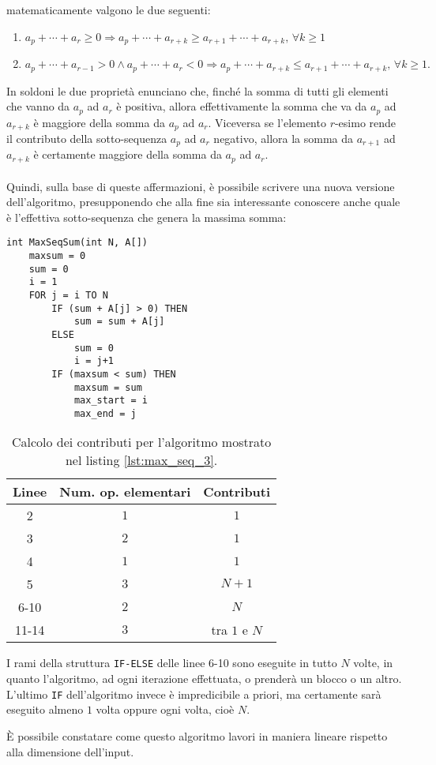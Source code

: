 \documentclass[11pt,a4paper,oneside]{article}
\begin{document}
matematicamente valgono le due seguenti:
\begin{enumerate}
	\item $a_p + \cdots + a_r \geq 0 \Rightarrow a_p + \cdots + a_{r+k} \geq a_{r+1} + \cdots + a_{r+k},\,\forall k \geq 1$ 
	\item $a_p + \cdots + a_{r-1} > 0 \wedge a_p + \cdots + a_r < 0 \Rightarrow a_p + \cdots + a_{r+k} \leq a_{r+1} + \cdots + a_{r+k},\, \forall k \geq 1\text{.}$
\end{enumerate}
In soldoni le due proprietà enunciano che, finché la somma di tutti gli elementi che vanno da $a_p$ ad $a_r$ è positiva, allora effettivamente la somma che va da $a_p$ ad $a_{r+k}$ è maggiore della somma da $a_p$ ad $a_r$. Viceversa se l'elemento $r$-esimo rende il contributo della sotto-sequenza $a_p$ ad $a_r$ negativo, allora la somma da $a_{r+1}$ ad $a_{r+k}$ è certamente maggiore della somma da $a_p$ ad $a_r$.\\\\Quindi, sulla base di queste affermazioni, è possibile scrivere una nuova versione dell'algoritmo, presupponendo che alla fine sia interessante conoscere anche quale è l'effettiva sotto-sequenza che genera la massima somma:

\begin{lstlisting}[caption={Calcolo della massima somma di una sotto-sequenza, versione 3.},label={lst:max_seq_3}]
int MaxSeqSum(int N, A[])
	maxsum = 0
	sum = 0
	i = 1
	FOR j = i TO N
		IF (sum + A[j] > 0) THEN
			sum = sum + A[j]
		ELSE
			sum = 0
			i = j+1
		IF (maxsum < sum) THEN
			maxsum = sum
			max_start = i
			max_end = j
\end{lstlisting}

\begin{table}[h]
	\centering
	\begin{tabular}{ c | c | c }
		\textbf{Linee} & \textbf{Num. op. elementari} & \textbf{Contributi} \\ \hline
		2 & $1$ & $1$ \\
		3 & $2$ & $1$ \\
		4 & $1$ & $1$ \\ 
		5 & $3$ & $N+1$ \\
		6-10 & $2$ & $N$ \\
		11-14 & $3$ & tra $1$ e $N$ \\
	\end{tabular}
	\caption{Calcolo dei contributi per l'algoritmo mostrato nel listing \ref{lst:max_seq_3}.}
	\label{tbl:max_seq_3}
\end{table}

I rami della struttura \texttt{IF-ELSE} delle linee 6-10 sono eseguite in tutto $N$ volte, in quanto l'algoritmo, ad ogni iterazione effettuata, o prenderà un blocco o un altro. L'ultimo \texttt{IF} dell'algoritmo invece è impredicibile a priori, ma certamente sarà eseguito almeno $1$ volta oppure ogni volta, cioè $N$.

È possibile constatare come questo algoritmo lavori in maniera lineare rispetto alla dimensione dell'input.
\end{document}
